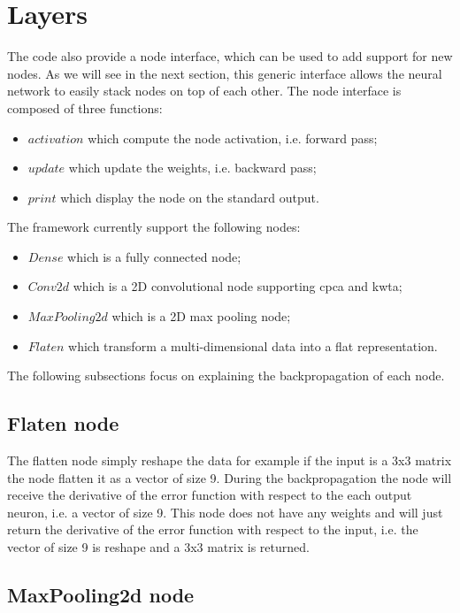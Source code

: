 \documentclass[11pt]{report}
\begin{document}
\section{Layers} \label{sec:nodes}

The code also provide a node interface, which can be used to add support for new nodes. As we will see in the next section, this generic interface allows the neural network to easily stack nodes on top of each other. The node interface is composed of three functions:
\begin{itemize}
	\item $activation$ which compute the node activation, i.e. forward pass;
	\item $update$ which update the weights, i.e. backward pass;
	\item $print$ which display the node on the standard output.
\end{itemize}

\noindent The framework currently support the following nodes:
\begin{itemize}
	\item $Dense$ which is a fully connected node;
	\item $Conv2d$ which is a 2D convolutional node supporting \acrshort{cpca} and  \acrshort{kwta};
	\item $MaxPooling2d$ which is a 2D max pooling node;
	\item $Flaten$ which transform a multi-dimensional data into a flat representation.
\end{itemize}

\noindent The following subsections focus on explaining the backpropagation of each node.

\subsection{Flaten node}

The flatten node simply reshape the data for example if the input is a 3x3 matrix the node flatten it as a vector of size 9. During the backpropagation the node will receive the derivative of the error function with respect to the each output neuron, i.e. a vector of size 9. This node does not have any weights and will just return the derivative of the error function with respect to the input, i.e. the vector of size 9 is reshape and a 3x3 matrix is returned.

\subsection{MaxPooling2d node}
\end{document}
